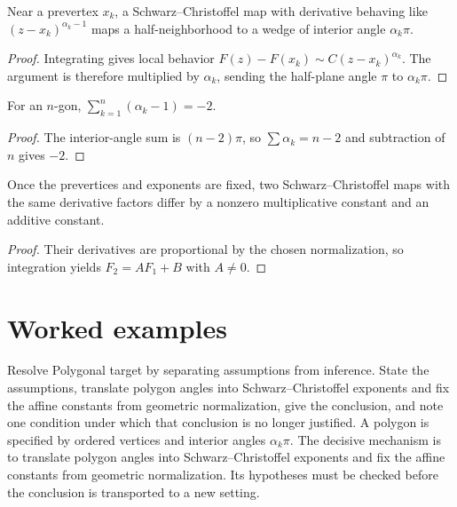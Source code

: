 \begin{theorem}\label{thm:iv18-01}
Near a prevertex $x_k$, a Schwarz–Christoffel map with derivative behaving like $(z-x_k)^{\alpha_k-1}$ maps a half-neighborhood to a wedge of interior angle $\alpha_k\pi$.
\begin{proof}
Integrating gives local behavior $F(z)-F(x_k)\sim C(z-x_k)^{\alpha_k}$. The argument is therefore multiplied by $\alpha_k$, sending the half-plane angle $\pi$ to $\alpha_k\pi$.
\end{proof}
\end{theorem}

\begin{theorem}\label{thm:iv18-02}
For an $n$-gon, $\sum_{k=1}^n(\alpha_k-1)=-2$.
\begin{proof}
The interior-angle sum is $(n-2)\pi$, so $\sum\alpha_k=n-2$ and subtraction of $n$ gives $-2$.
\end{proof}
\end{theorem}

\begin{theorem}\label{thm:iv18-03}
Once the prevertices and exponents are fixed, two Schwarz–Christoffel maps with the same derivative factors differ by a nonzero multiplicative constant and an additive constant.
\begin{proof}
Their derivatives are proportional by the chosen normalization, so integration yields $F_2=A F_1+B$ with $A\ne0$.
\end{proof}
\end{theorem}

\section{Worked examples}

\begin{example}\label{ex:iv18-worked-01}
Resolve Polygonal target by separating assumptions from inference. State the assumptions, translate polygon angles into Schwarz--Christoffel exponents and fix the affine constants from geometric normalization, give the conclusion, and note one condition under which that conclusion is no longer justified. A polygon is specified by ordered vertices and interior angles $\alpha_k\pi$. The decisive mechanism is to translate polygon angles into Schwarz--Christoffel exponents and fix the affine constants from geometric normalization. Its hypotheses must be checked before the conclusion is transported to a new setting.
\end{example}

